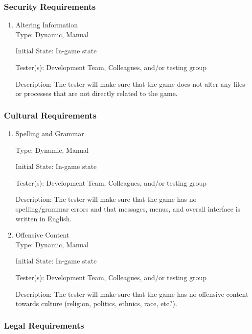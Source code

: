 \documentclass[12pt, titlepage]{article}
\begin{document}
\subsubsection{Security Requirements}

\begin{enumerate}

\item{Altering Information\\}
Type: Dynamic, Manual

Initial State: In-game state

Tester(s): Development Team, Colleagues, and/or testing group

Description: The tester will make sure that the game does not alter any files or processes that are not directly related to the game.

\end{enumerate}


\subsubsection{Cultural Requirements}

\begin{enumerate}

\item{Spelling and Grammar\\}

Type: Dynamic, Manual

Initial State: In-game state

Tester(s): Development Team, Colleagues, and/or testing group

Description: The tester will make sure that the game has no spelling/grammar errors and that messages, menus, and overall interface is written in English.

\item{Offensive Content\\}
Type: Dynamic, Manual

Initial State: In-game state

Tester(s): Development Team, Colleagues, and/or testing group

Description: The tester will make sure that the game has no offensive content towards culture (religion, politics, ethnics, race, etc?).

\end{enumerate}

\subsubsection{Legal Requirements}
\end{document}
